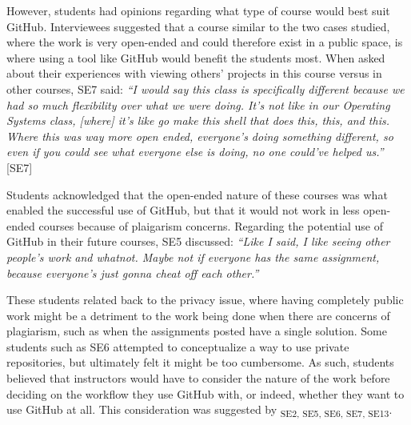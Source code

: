 However, students had opinions regarding what type of course would best suit GitHub. Interviewees suggested that a course similar to the two cases studied, where the work is very open-ended and could therefore exist in a public space, is where using a tool like GitHub would benefit the students most. When asked about their experiences with viewing others' projects in this course versus in other courses, SE7 said: \textit{``I would say this class is specifically different because we had so much flexibility over what we were doing. It's not like in our Operating Systems class, [where] it's like go make this shell that does this, this, and this. Where this was way more open ended, everyone's doing something different, so even if you could see what everyone else is doing, no one could've helped us.''} [SE7]

Students acknowledged that the open-ended nature of these courses was what enabled the successful use of GitHub, but that it would not work in less open-ended courses because of plaigarism concerns. Regarding the potential use of GitHub in their future courses, SE5 discussed: \textit{``Like I said, I like seeing other people's work and whatnot. Maybe not if everyone has the same assignment, because everyone's just gonna cheat off each other.''}



These students related back to the privacy issue, where having completely public work might be a detriment to the work being done when there are concerns of plagiarism, such as when the assignments posted have a single solution. Some students such as SE6 attempted to conceptualize a way to use private repositories, but ultimately felt it might be too cumbersome. As such, students believed that instructors would have to consider the nature of the work before deciding on the workflow they use GitHub with, or indeed, whether they want to use GitHub at all. This consideration was suggested by \textsubscript{SE2, SE5, SE6, SE7, SE13}.

